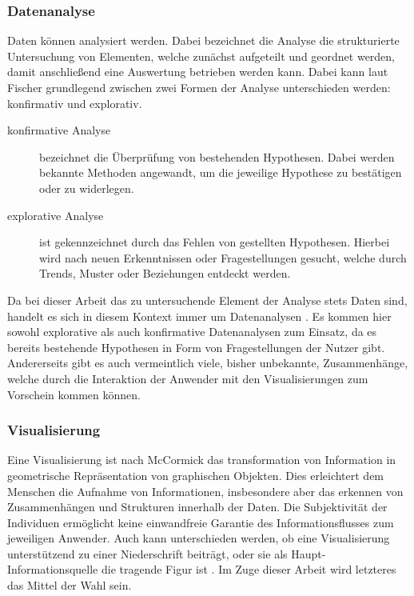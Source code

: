 \subsubsection{Datenanalyse}
\label{subsub:datenanalyse}
Daten können analysiert werden.
Dabei bezeichnet die Analyse die strukturierte Untersuchung von Elementen, welche zunächst aufgeteilt und geordnet werden, damit anschließend eine Auswertung betrieben werden kann.
Dabei kann laut Fischer \cite{Fischer.2014} grundlegend zwischen zwei Formen der Analyse unterschieden werden: konfirmativ und explorativ.
\begin{description}
\item[konfirmative Analyse] bezeichnet die Überprüfung von bestehenden Hypothesen.
Dabei werden bekannte Methoden angewandt, um die jeweilige Hypothese zu bestätigen oder zu widerlegen.
\item[explorative Analyse] ist gekennzeichnet durch das Fehlen von gestellten Hypothesen.
Hierbei wird nach neuen Erkenntnissen oder Fragestellungen gesucht, welche durch Trends, Muster oder Beziehungen entdeckt werden.
\end{description}

Da bei dieser Arbeit das zu untersuchende Element der Analyse stets Daten sind, handelt es sich in diesem Kontext immer um \glqq Datenanalysen\grqq{} \cite{Schumann.2000}.
Es kommen hier sowohl explorative als auch konfirmative Datenanalysen zum Einsatz, da es bereits bestehende Hypothesen in Form von Fragestellungen der Nutzer gibt.
Andererseits gibt es auch vermeintlich viele, bisher unbekannte, Zusammenhänge, welche durch die Interaktion der Anwender mit den Visualisierungen zum Vorschein kommen können.


\subsubsection{Visualisierung}
\label{subsub:visual}
Eine Visualisierung ist nach McCormick \cite{Mccormick.1987} das transformation von Information in geometrische Repräsentation von graphischen Objekten.
Dies erleichtert dem Menschen die Aufnahme von Informationen, insbesondere aber das erkennen von Zusammenhängen und Strukturen innerhalb der Daten.
Die Subjektivität der Individuen ermöglicht keine einwandfreie Garantie des Informationsflusses zum jeweiligen Anwender. %
Auch kann unterschieden werden, ob eine Visualisierung unterstützend zu einer Niederschrift beiträgt, oder sie als Haupt-Informationsquelle die tragende Figur ist \cite{Bassler.2010}.
Im Zuge dieser Arbeit wird letzteres das Mittel der Wahl sein.

